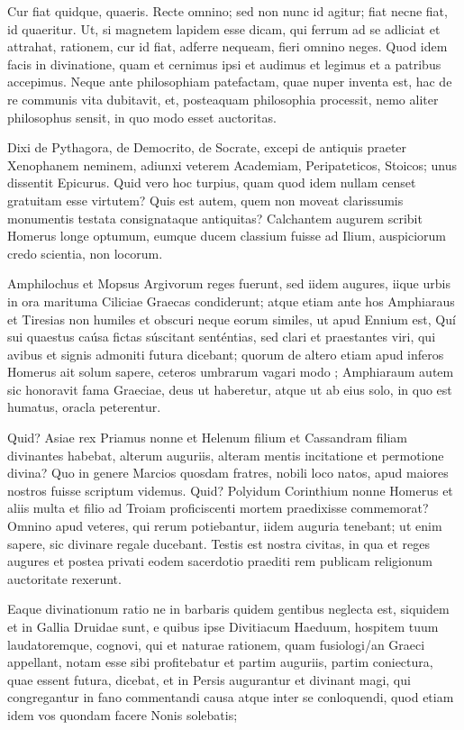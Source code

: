  Cur fiat quidque, quaeris. Recte omnino; sed non nunc id agitur; fiat necne fiat, id quaeritur. Ut, si magnetem lapidem esse dicam, qui ferrum ad se adliciat et attrahat, rationem, cur id fiat, adferre nequeam, fieri omnino neges. Quod idem facis in divinatione, quam et cernimus ipsi et audimus et legimus et a patribus accepimus. Neque ante philosophiam patefactam, quae nuper inventa est, hac de re communis vita dubitavit, et, posteaquam philosophia processit, nemo aliter philosophus sensit, in quo modo esset auctoritas.

 Dixi de Pythagora, de Democrito, de Socrate, excepi de antiquis praeter Xenophanem neminem, adiunxi veterem Academiam, Peripateticos, Stoicos; unus dissentit Epicurus. Quid vero hoc turpius, quam quod idem nullam censet gratuitam esse virtutem? Quis est autem, quem non moveat clarissumis monumentis testata consignataque antiquitas? Calchantem augurem scribit Homerus longe optumum, eumque ducem classium fuisse ad Ilium, auspiciorum credo scientia, non locorum.

 Amphilochus et Mopsus Argivorum reges fuerunt, sed iidem augures, iique urbis in ora marituma Ciliciae Graecas condiderunt; atque etiam ante hos Amphiaraus et Tiresias non humiles et obscuri neque eorum similes, ut apud Ennium est, Quí sui quaestus caúsa fictas súscitant senténtias, sed clari et praestantes viri, qui avibus et signis admoniti futura dicebant; quorum de altero etiam apud inferos Homerus ait solum sapere, ceteros umbrarum vagari modo ; Amphiaraum autem sic honoravit fama Graeciae, deus ut haberetur, atque ut ab eius solo, in quo est humatus, oracla peterentur.

 Quid? Asiae rex Priamus nonne et Helenum filium et Cassandram filiam divinantes habebat, alterum auguriis, alteram mentis incitatione et permotione divina? Quo in genere Marcios quosdam fratres, nobili loco natos, apud maiores nostros fuisse scriptum videmus. Quid? Polyidum Corinthium nonne Homerus et aliis multa et filio ad Troiam proficiscenti mortem praedixisse commemorat? Omnino apud veteres, qui rerum potiebantur, iidem auguria tenebant; ut enim sapere, sic divinare regale ducebant. Testis est nostra civitas, in qua et reges augures et postea privati eodem sacerdotio praediti rem publicam religionum auctoritate rexerunt.

 Eaque divinationum ratio ne in barbaris quidem gentibus neglecta est, siquidem et in Gallia Druidae sunt, e quibus ipse Divitiacum Haeduum, hospitem tuum laudatoremque, cognovi, qui et naturae rationem, quam fusiologi/an Graeci appellant, notam esse sibi profitebatur et partim auguriis, partim coniectura, quae essent futura, dicebat, et in Persis augurantur et divinant magi, qui congregantur in fano commentandi causa atque inter se conloquendi, quod etiam idem vos quondam facere Nonis solebatis;

